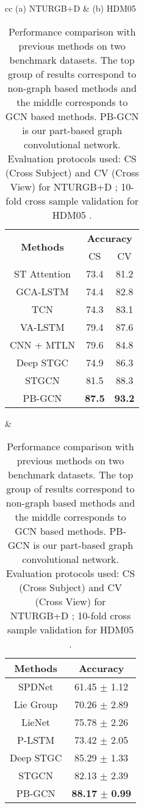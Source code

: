\documentclass{bmvc2k}
\begin{document}
\begin{table}[t]
    \begin{center}
        \small
        \begin{tabular}{cc}
            (a) NTURGB+D & (b) HDM05 \\
            \begin{tabular}{ccc}
            \toprule
            \multirow{2}{*}{\textbf{Methods}} & \multicolumn{2}{c}{\textbf{Accuracy}} \\
            & CS & CV \\
            \midrule
            ST Attention \cite{song2017end} & 73.4 & 81.2 \\
            GCA-LSTM \cite{liu2017global} & 74.4 & 82.8 \\
            TCN \cite{kim2017interpretable} & 74.3 & 83.1 \\
            VA-LSTM \cite{zhang2017view} & 79.4 & 87.6 \\
            CNN + MTLN \cite{ke2017new} & 79.6 & 84.8 \\
            \midrule
            Deep STGC \cite{li2018spatio} & 74.9 & 86.3 \\
            STGCN \cite{yan2018spatial} & 81.5 & 88.3 \\
            \midrule
            PB-GCN & \textbf{87.5} & \textbf{93.2} \\
            \bottomrule
            \end{tabular}
            &
            \begin{tabular}{cc}
                \toprule
                \textbf{Methods} & \textbf{Accuracy} \\
                \midrule
                SPDNet \cite{huang2017riemannian} & 61.45 $\pm$ 1.12 \\
                Lie Group \cite{vemulapalli2014human} & 70.26 $\pm$ 2.89 \\
                LieNet \cite{huang2017deep} & 75.78 $\pm$ 2.26 \\
                P-LSTM \cite{Shahroudy_2016_CVPR} & 73.42 $\pm$ 2.05 \\
                \midrule
                Deep STGC \cite{li2018spatio} & 85.29 $\pm$ 1.33 \\
                STGCN \cite{yan2018spatial} & 82.13 $\pm$ 2.39 \\
                \midrule
                PB-GCN & \textbf{88.17} $\pm$ \textbf{0.99} \\
                \bottomrule
            \end{tabular}
        \end{tabular}
    \end{center}
    \caption{\small{Performance comparison with previous methods on two benchmark datasets. The top group of results correspond to non-graph based methods and the middle corresponds to GCN based methods. PB-GCN is our part-based graph convolutional network. Evaluation protocols used: CS (Cross Subject) and CV (Cross View) for NTURGB+D \cite{Shahroudy_2016_CVPR}; 10-fold cross sample validation for HDM05 \cite{huang2017riemannian}.}}
    \label{tab:sota}
\end{table}
\end{document}
